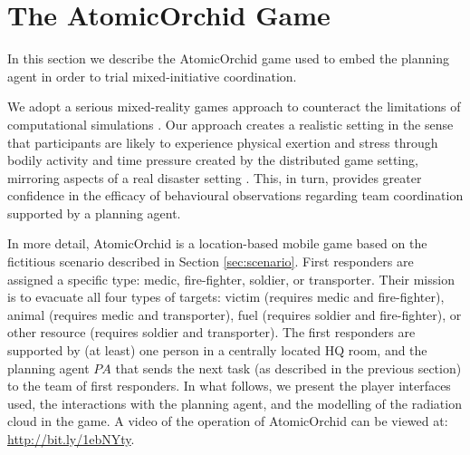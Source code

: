 \section{The A\lowercase{tomic}O\lowercase{rchid} Game}\label{sec:atomicorchid}
\noindent In this section we describe the AtomicOrchid game used to embed the planning agent in order to trial mixed-initiative coordination.

We adopt a serious mixed-reality games approach to counteract the limitations of computational simulations \cite{Fischer:etal:2012}. Our approach creates a realistic setting in the sense that participants are likely to experience physical exertion and stress through bodily activity and time pressure created by the distributed game setting, mirroring aspects of a real disaster setting \cite{paho:2001}. This, in turn, provides greater confidence in the efficacy of behavioural observations regarding team coordination supported by a planning agent.


In more detail, AtomicOrchid is a location-based mobile game based on the fictitious scenario described in Section \ref{sec:scenario}. First responders are assigned a specific type: medic, fire-fighter, soldier, or transporter. Their mission is to evacuate all four types of targets: victim (requires medic and fire-fighter), animal (requires medic and transporter), fuel (requires soldier and fire-fighter), or other resource (requires soldier and transporter).  The first responders are supported by (at least) one person in a centrally located HQ room, and the planning agent $PA$ that sends the next task (as described in the previous section) to the team of first responders. In what follows, we present the player interfaces used, the interactions with the planning agent, and the modelling of the radiation cloud in the game. A video of the operation of AtomicOrchid can be viewed at: \url{http://bit.ly/1ebNYty}.






